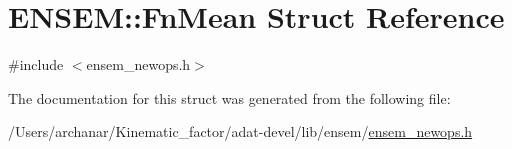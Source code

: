 \hypertarget{structENSEM_1_1FnMean}{}\section{E\+N\+S\+EM\+:\+:Fn\+Mean Struct Reference}
\label{structENSEM_1_1FnMean}


{\ttfamily \#include $<$ensem\+\_\+newops.\+h$>$}



The documentation for this struct was generated from the following file\+:\begin{DoxyCompactItemize}
\item 
/\+Users/archanar/\+Kinematic\+\_\+factor/adat-\/devel/lib/ensem/\mbox{\hyperlink{adat-devel_2lib_2ensem_2ensem__newops_8h}{ensem\+\_\+newops.\+h}}\end{DoxyCompactItemize}
